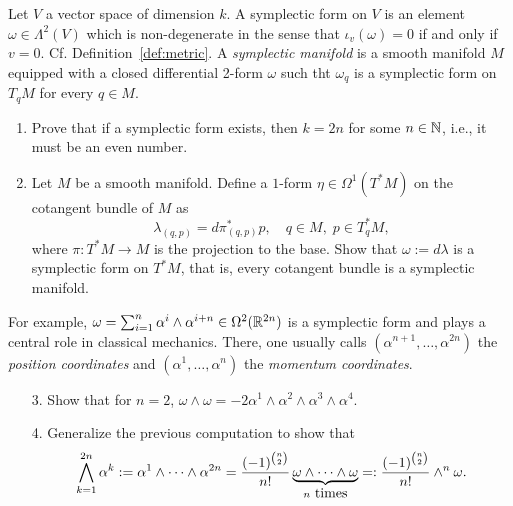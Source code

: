 \begin{exercise}\label{exe:symplectic}
  Let $V$ a vector space of dimension $k$.
  A symplectic form on $V$ is an element $\omega\in\Lambda^2(V)$ which is non-degenerate in the sense that $\iota_v(\omega) = 0$ if and only if $v=0$.
  Cf. Definition~\ref{def:metric}.
  A \emph{symplectic manifold} is a smooth manifold $M$ equipped with a closed differential 2-form $\omega$ such tht $\omega_q$ is a symplectic form on $T_q M$ for every $q\in M$.
  \begin{enumerate}
    \item Prove that if a symplectic form exists, then $k=2n$ for some $n\in\mathbb{N}$, i.e., it must be an even number.
    \item Let $M$ be a smooth manifold. Define a $1$-form $\eta\in\Omega^1(T^*M)$ on the cotangent bundle of $M$ as
      \begin{equation}
        \lambda_{(q,p)} = d\pi_{(q,p)}^*p,
        \quad
        q\in M, \;
        p\in T_q^*M,
      \end{equation}
      where $\pi:T^*M\to M$ is the projection to the base.
      Show that $\omega := d\lambda$ is a symplectic form on $T^* M$, that is, every cotangent bundle is a symplectic manifold.
  \end{enumerate}

  For example, $\omega = \sum_{i=1}^n \alpha^i\wedge \alpha^{i+n}\in\Omega^2(\mathbb{R}^{2n})$ is a symplectic form and plays a central role in classical mechanics. There, one usually calls $(\alpha^{n+1},\ldots,\alpha^{2n})$ the \emph{position coordinates} and $(\alpha^{1},\ldots,\alpha^{n})$ the \emph{momentum coordinates}.
  \begin{enumerate}
    \item[3.] Show that for $n=2$, $\omega \wedge \omega = -2 \alpha^1\wedge\alpha^2\wedge\alpha^3\wedge\alpha^4$.

    \item[4.] Generalize the previous computation to show that
      \begin{equation}
        \bigwedge_{k=1}^{2n} \alpha^k := \alpha^1\wedge\cdots\wedge\alpha^{2n} = \frac{(-1)^{\binom{n}{2}}}{n!} \LaTeXunderbrace{\omega\wedge\cdots\wedge\omega}_{n\mbox{ times}} =: \frac{(-1)^{\binom{n}{2}}}{n!} \wedge^{n} \omega.
      \end{equation}
  \end{enumerate}
\end{exercise}

